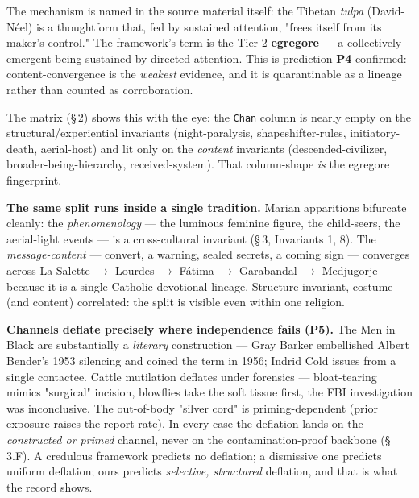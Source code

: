 \documentclass[11pt]{article}
\begin{document}
The mechanism is named in the source material itself: the Tibetan \emph{tulpa} (David-Néel) is a thoughtform that, fed by sustained attention, "frees itself from its maker's control." The framework's term is the Tier-2 \textbf{egregore} --- a collectively-emergent being sustained by directed attention. This is prediction \textbf{P4} confirmed: content-convergence is the \emph{weakest} evidence, and it is quarantinable as a lineage rather than counted as corroboration.

The matrix (\S\,2) shows this with the eye: the \texttt{Chan} column is nearly empty on the structural/experiential invariants (night-paralysis, shapeshifter-rules, initiatory-death, aerial-host) and lit only on the \emph{content} invariants (descended-civilizer, broader-being-hierarchy, received-system). That column-shape \emph{is} the egregore fingerprint.

\textbf{The same split runs inside a single tradition.} Marian apparitions bifurcate cleanly: the \emph{phenomenology} --- the luminous feminine figure, the child-seers, the aerial-light events --- is a cross-cultural invariant (\S\,3, Invariants 1, 8). The \emph{message-content} --- convert, a warning, sealed secrets, a coming sign --- converges across La Salette $\rightarrow$ Lourdes $\rightarrow$ Fátima $\rightarrow$ Garabandal $\rightarrow$ Medjugorje because it is a single Catholic-devotional lineage. Structure invariant, costume (and content) correlated: the split is visible even within one religion.

\textbf{Channels deflate precisely where independence fails (P5).} The Men in Black are substantially a \emph{literary} construction --- Gray Barker embellished Albert Bender's 1953 silencing and coined the term in 1956; Indrid Cold issues from a single contactee. Cattle mutilation deflates under forensics --- bloat-tearing mimics "surgical" incision, blowflies take the soft tissue first, the FBI investigation was inconclusive. The out-of-body "silver cord" is priming-dependent (prior exposure raises the report rate). In every case the deflation lands on the \emph{constructed or primed} channel, never on the contamination-proof backbone (\S\,3.F). A credulous framework predicts no deflation; a dismissive one predicts uniform deflation; ours predicts \emph{selective, structured} deflation, and that is what the record shows.
\end{document}
